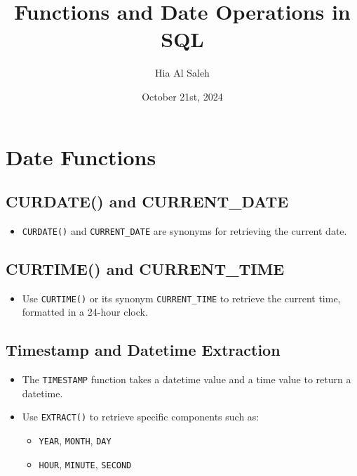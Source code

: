 \documentclass{article}
\begin{document}
\title{Functions and Date Operations in SQL}
\author{Hia Al Saleh}
\date{October 21st, 2024}
\maketitle
\tableofcontents
\newpage

\section{Date Functions}
\subsection{CURDATE() and CURRENT\_DATE}
\begin{itemize}
    \item \texttt{CURDATE()} and \texttt{CURRENT\_DATE} are synonyms for retrieving the current date.
\end{itemize}

\subsection{CURTIME() and CURRENT\_TIME}
\begin{itemize}
    \item Use \texttt{CURTIME()} or its synonym \texttt{CURRENT\_TIME} to retrieve the current time, formatted in a 24-hour clock.
\end{itemize}

\subsection{Timestamp and Datetime Extraction}
\begin{itemize}
    \item The \texttt{TIMESTAMP} function takes a datetime value and a time value to return a datetime.
    \item Use \texttt{EXTRACT()} to retrieve specific components such as:
    \begin{itemize}
        \item \texttt{YEAR}, \texttt{MONTH}, \texttt{DAY}
        \item \texttt{HOUR}, \texttt{MINUTE}, \texttt{SECOND}
    \end{itemize}
\end{itemize}
\end{document}
